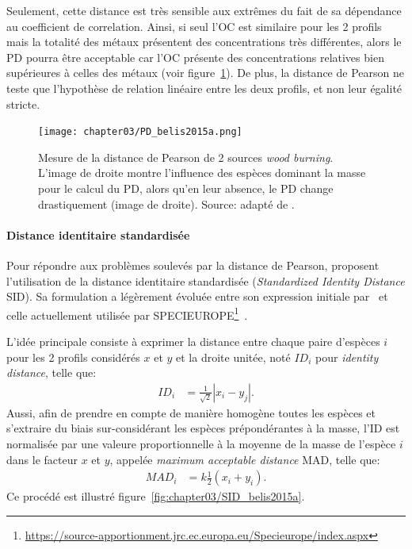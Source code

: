 Seulement, cette distance est très sensible aux extrêmes du fait de sa dépendance au
coefficient de correlation. Ainsi, si seul l'OC est similaire pour les 2 profils mais la
totalité des métaux présentent des concentrations très différentes, alors le PD pourra
être acceptable car l'OC présente des concentrations relatives bien supérieures à celles
des métaux (voir figure~\ref{fig:chapter03/PD_belis2015a}).
De plus, la distance de Pearson ne teste que l'hypothèse de relation linéaire entre les
deux profils, et non leur égalité stricte.

\begin{figure}[ht]
    \centering
    \texttt{[image: chapter03/PD\_belis2015a.png]}
    \caption{Mesure de la distance de Pearson de 2 sources \textit{wood burning}. L'image
        de droite montre l'influence des espèces dominant la masse pour le calcul du PD, alors
        qu'en leur absence, le PD change drastiquement (image de droite). Source: adapté de
        \cite[figure 3]{belisNew2015}.
}%
    \label{fig:chapter03/PD_belis2015a}
\end{figure}


\paragraph{Distance identitaire standardisée}%
\label{par:distance_identitaire_standardisée}

Pour répondre aux problèmes soulevés par la distance de Pearson, \cite{belisNew2015}
proposent l'utilisation de la distance identitaire standardisée (\textit{Standardized
Identity Distance} SID). Sa formulation a légèrement évoluée entre son expression
initiale par~\cite{belisNew2015} et celle actuellement utilisée par
SPECIEUROPE\footnote{\url{https://source-apportionment.jrc.ec.europa.eu/Specieurope/index.aspx}}~\autocite{pernigottiSPECIEUROPE2016,pernigottiDeltaSA2018}.

L'idée principale consiste à exprimer la distance entre chaque paire d'espèces $i$ pour les 2
profils considérés $x$ et $y$ et la droite unitée, noté $ID_i$ pour \textit{identity
distance}, telle que:
\begin{align}
    \label{eq:IDi}
    ID_i &= \frac{1}{\sqrt{2}}|x_i - y_j|.
\end{align}
Aussi, afin de prendre en compte de manière homogène toutes les espèces et s'extraire du
biais sur-considérant les espèces prépondérantes à la masse, l'ID est normalisée par une
valeure proportionnelle à la moyenne de la masse de l'espèce $i$ dans le facteur $x$ et
$y$, appelée \textit{maximum acceptable distance} MAD, telle que:
\begin{align}
    \label{eq:MAD}
    MAD_i &= k \frac{1}{2}(x_i + y_i).
\end{align}
Ce procédé est illustré figure~\ref{fig:chapter03/SID_belis2015a}.

